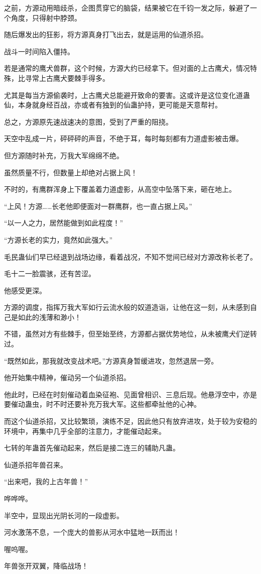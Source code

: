 \begin{this_body}
之前，方源动用暗歧杀，企图贯穿它的脑袋，结果被它在千钧一发之际，躲避了一个角度，只得射中脖颈。

随后爆发出的狂影，将方源真身打飞出去，就是运用的仙道杀招。

战斗一时间陷入僵持。

若是通常的鹰犬兽群，这个时候，方源大约已经拿下。但对面的上古鹰犬，情况特殊，比寻常上古鹰犬要棘手得多。

尤其是每当方源偷袭时，上古鹰犬总能避开致命的要害。这或许是这位变化道蛊仙，本身就身经百战，亦或者有独到的仙蛊护持，更可能是天意帮衬。

总之，方源原先速战速决的意图，受到了严重的阻挠。

天空中乱成一片，砰砰砰的声音，不绝于耳，每时每刻都有力道虚影被击爆。

但方源随时补充，万我大军绵绵不绝。

虽然质量不行，但数量上却绝对占据上风！

不时的，有鹰群浑身上下覆盖着力道虚影，从高空中坠落下来，砸在地上。

“上风！方源……长老他即便面对一群鹰群，也一直占据上风。”

“以一人之力，居然能做到如此程度！”

“方源长老的实力，竟然如此强大。”

毛民蛊仙们早已经退到战场边缘，看着战况，不知不觉间已经对方源改称长老了。

毛十二一脸震骇，还有苦涩。

他感受更深。

方源的调度，指挥万我大军如行云流水般的奴道造诣，让他在这一刻，从未感到自己是如此的浅薄和渺小！

不错，虽然对方有些棘手，但至始至终，方源都占据优势地位，从未被鹰犬们逆转过。

“既然如此，那我就改变战术吧。”方源真身暂缓进攻，忽然退居一旁。

他开始集中精神，催动另一个仙道杀招。

他此时，已经在时刻催动着血染征袍、见面曾相识、三息后现。他悬浮空中，亦是要催动蛊虫，时不时还要补充万我大军。这些都牵扯他的心神。

而这个仙道杀招，又比较繁琐，演练不足，因此他只有放弃进攻，处于较为安稳的环境中，再集中几乎全部的注意力，才能催动起来。

七转的年蛊首先催动起来，然后是接二连三的辅助凡蛊。

仙道杀招年兽召来。

“出来吧，我的上古年兽！”

哗哗哗。

半空中，显现出光阴长河的一段虚影。

河水激荡不息，一个庞大的兽影从河水中猛地一跃而出！

喔呜喔。

年兽张开双翼，降临战场！

\end{this_body}

